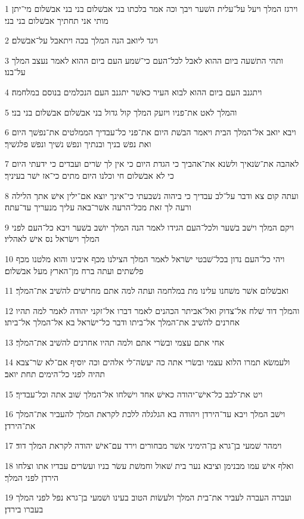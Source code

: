 \par 1 וירגז המלך ויעל על־עלית השׁער ויבך וכה אמר בלכתו בני אבשׁלום בני בני אבשׁלום מי־יתן מותי אני תחתיך אבשׁלום בני בני׃
\par 2 ויגד ליואב הנה המלך בכה ויתאבל על־אבשׁלם׃
\par 3 ותהי התשׁעה ביום ההוא לאבל לכל־העם כי־שׁמע העם ביום ההוא לאמר נעצב המלך על־בנו׃
\par 4 ויתגנב העם ביום ההוא לבוא העיר כאשׁר יתגנב העם הנכלמים בנוסם במלחמה׃
\par 5 והמלך לאט את־פניו ויזעק המלך קול גדול בני אבשׁלום אבשׁלום בני בני׃
\par 6 ויבא יואב אל־המלך הבית ויאמר הבשׁת היום את־פני כל־עבדיך הממלטים את־נפשׁך היום ואת נפשׁ בניך ובנתיך ונפשׁ נשׁיך ונפשׁ פלגשׁיך׃
\par 7 לאהבה את־שׂנאיך ולשׂנא את־אהביך כי הגדת היום כי אין לך שׂרים ועבדים כי ידעתי היום כי לא אבשׁלום חי וכלנו היום מתים כי־אז ישׁר בעיניך׃
\par 8 ועתה קום צא ודבר על־לב עבדיך כי ביהוה נשׁבעתי כי־אינך יוצא אם־ילין אישׁ אתך הלילה ורעה לך זאת מכל־הרעה אשׁר־באה עליך מנעריך עד־עתה׃
\par 9 ויקם המלך וישׁב בשׁער ולכל־העם הגידו לאמר הנה המלך יושׁב בשׁער ויבא כל־העם לפני המלך וישׂראל נס אישׁ לאהליו׃
\par 10 ויהי כל־העם נדון בכל־שׁבטי ישׂראל לאמר המלך הצילנו מכף איבינו והוא מלטנו מכף פלשׁתים ועתה ברח מן־הארץ מעל אבשׁלום׃
\par 11 ואבשׁלום אשׁר משׁחנו עלינו מת במלחמה ועתה למה אתם מחרשׁים להשׁיב את־המלך׃
\par 12 והמלך דוד שׁלח אל־צדוק ואל־אביתר הכהנים לאמר דברו אל־זקני יהודה לאמר למה תהיו אחרנים להשׁיב את־המלך אל־ביתו ודבר כל־ישׂראל בא אל־המלך אל־ביתו׃
\par 13 אחי אתם עצמי ובשׂרי אתם ולמה תהיו אחרנים להשׁיב את־המלך׃
\par 14 ולעמשׂא תמרו הלוא עצמי ובשׂרי אתה כה יעשׂה־לי אלהים וכה יוסיף אם־לא שׂר־צבא תהיה לפני כל־הימים תחת יואב׃
\par 15 ויט את־לבב כל־אישׁ־יהודה כאישׁ אחד וישׁלחו אל־המלך שׁוב אתה וכל־עבדיך׃
\par 16 וישׁב המלך ויבא עד־הירדן ויהודה בא הגלגלה ללכת לקראת המלך להעביר את־המלך את־הירדן׃
\par 17 וימהר שׁמעי בן־גרא בן־הימיני אשׁר מבחורים וירד עם־אישׁ יהודה לקראת המלך דוד׃
\par 18 ואלף אישׁ עמו מבנימן וציבא נער בית שׁאול וחמשׁת עשׂר בניו ועשׂרים עבדיו אתו וצלחו הירדן לפני המלך׃
\par 19 ועברה העברה לעביר את־בית המלך ולעשׂות הטוב בעינו ושׁמעי בן־גרא נפל לפני המלך בעברו בירדן׃
